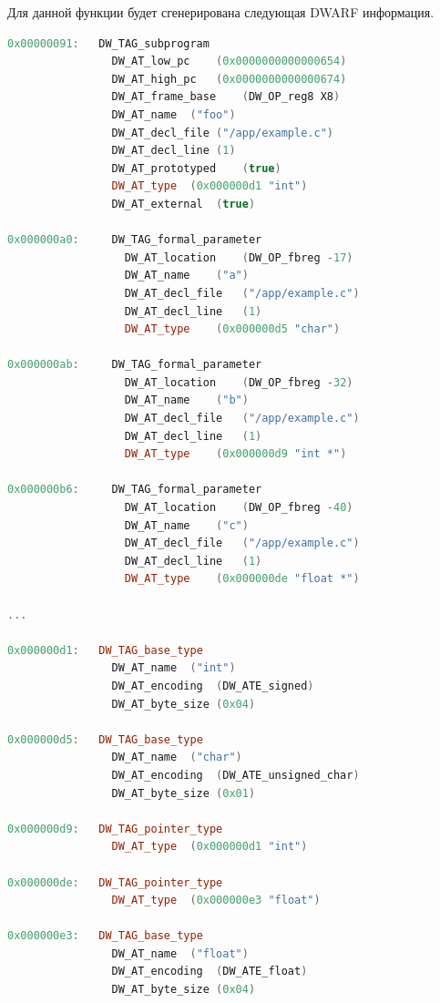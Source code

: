 Для данной функции будет сгенерирована следующая DWARF информация.

\begin{samepage}
\begin{lstlisting}[language=C++, caption={Часть сгенерированной DWARF-информации, соответствующая функции foo},
	label=lst:simple_example_dwarf]
0x00000091:   DW_TAG_subprogram
                DW_AT_low_pc	(0x0000000000000654)
                DW_AT_high_pc	(0x0000000000000674)
                DW_AT_frame_base	(DW_OP_reg8 X8)
                DW_AT_name	("foo")
                DW_AT_decl_file	("/app/example.c")
                DW_AT_decl_line	(1)
                DW_AT_prototyped	(true)
                DW_AT_type	(0x000000d1 "int")
                DW_AT_external	(true)

0x000000a0:     DW_TAG_formal_parameter
                  DW_AT_location	(DW_OP_fbreg -17)
                  DW_AT_name	("a")
                  DW_AT_decl_file	("/app/example.c")
                  DW_AT_decl_line	(1)
                  DW_AT_type	(0x000000d5 "char")

0x000000ab:     DW_TAG_formal_parameter
                  DW_AT_location	(DW_OP_fbreg -32)
                  DW_AT_name	("b")
                  DW_AT_decl_file	("/app/example.c")
                  DW_AT_decl_line	(1)
                  DW_AT_type	(0x000000d9 "int *")

0x000000b6:     DW_TAG_formal_parameter
                  DW_AT_location	(DW_OP_fbreg -40)
                  DW_AT_name	("c")
                  DW_AT_decl_file	("/app/example.c")
                  DW_AT_decl_line	(1)
                  DW_AT_type    (0x000000de "float *")

...

0x000000d1:   DW_TAG_base_type
                DW_AT_name	("int")
                DW_AT_encoding	(DW_ATE_signed)
                DW_AT_byte_size	(0x04)

0x000000d5:   DW_TAG_base_type
                DW_AT_name	("char")
                DW_AT_encoding	(DW_ATE_unsigned_char)
                DW_AT_byte_size	(0x01)

0x000000d9:   DW_TAG_pointer_type
                DW_AT_type	(0x000000d1 "int")

0x000000de:   DW_TAG_pointer_type
                DW_AT_type	(0x000000e3 "float")

0x000000e3:   DW_TAG_base_type
                DW_AT_name	("float")
                DW_AT_encoding	(DW_ATE_float)
                DW_AT_byte_size	(0x04)
\end{lstlisting}
\end{samepage}

